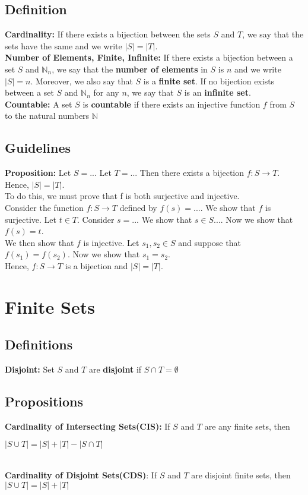 \documentclass[12pt]{report}
\begin{document}
		\subsection{Definition}
			\textbf{Cardinality:} If there exists a bijection between the sets $S$ and $T$, we say that the sets have the same and we write $|S| = |T|$. \\
			\textbf{Number of Elements, Finite, Infinite:} If there exists a bijection between a set $S$ and $\mathbb{N}_n$, we say that the \textbf{number of elements} in $S$ is $n$ and we write $|S| = n$. Moreover, we also say that $S$ is a \textbf{finite set}. If no bijection exists between a set $S$ and $\mathbb{N}_n$ for any $n$, we say that $S$ is an \textbf{infinite set}.\\
			\textbf{Countable: } A set $S$ is \textbf{countable} if there exists an injective function $f$ from $S$ to the natural numbers $\mathbb{N}$
		\subsection{Guidelines}
			\textbf{Proposition:} Let $S = ...$ Let $T = ...$ Then there exists a bijection $f: S \rightarrow T$. Hence, $|S| = |T|$. \\
			To do this, we must prove that f is both surjective and injective. \\
			Consider the function $f:S \rightarrow T$ defined by $f(s) = ...$. We show that $f$ is surjective. Let $t \in T$. Consider $s = ...$ We show that $s \in S ...$. Now we show that $f(s) = t$.\\ We then show that $f$ is injective. Let $s_1, s_2 \in S$ and suppose that $f(s_1) = f(s_2)$. Now we show that $s_1 = s_2$.\\
			Hence, $f:S \rightarrow T$ is a bijection and $|S| = |T|$.
	\section{Finite Sets}
		\subsection{Definitions}
			\textbf{Disjoint:} Set $S$ and $T$ are \textbf{disjoint} if $S \cap T = \emptyset$
			
		\subsection{Propositions}
			\textbf{Cardinality of Intersecting Sets(CIS):} If $S$ and $T$ are any finite sets, then \\
			\centerline{$|S \cup T| = |S| + |T| - |S \cap T|$}\\
			\textbf{Cardinality of Disjoint Sets(CDS)}: If $S$ and $T$ are disjoint finite sets, then $|S \cup T| = |S| + |T|$\\
			
\end{document}
